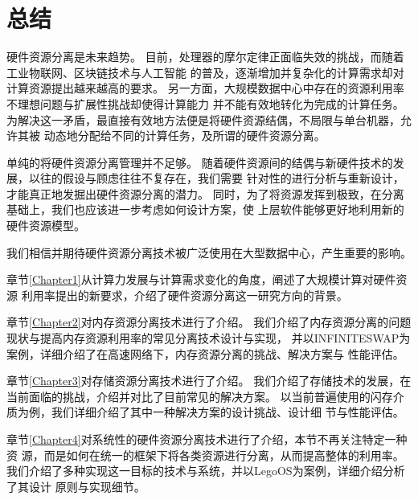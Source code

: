 \chapter{总结} %

\label{Chapter5} %

硬件资源分离是未来趋势。
目前，处理器的摩尔定律正面临失效的挑战，而随着工业物联网、区块链技术与人工智能
的普及，逐渐增加并复杂化的计算需求却对计算资源提出越来越高的要求。
另一方面，大规模数据中心中存在的资源利用率不理想问题与扩展性挑战却使得计算能力
并不能有效地转化为完成的计算任务。
为解决这一矛盾，最直接有效地方法便是将硬件资源结偶，不局限与单台机器，允许其被
动态地分配给不同的计算任务，及所谓的硬件资源分离。

单纯的将硬件资源分离管理并不足够。
随着硬件资源间的结偶与新硬件技术的发展，以往的假设与顾虑往往不复存在，我们需要
针对性的进行分析与重新设计，才能真正地发掘出硬件资源分离的潜力。
同时，为了将资源发挥到极致，在分离基础上，我们也应该进一步考虑如何设计方案，使
上层软件能够更好地利用新的硬件资源模型。

我们相信并期待硬件资源分离技术被广泛使用在大型数据中心，产生重要的影响。

章节\ref{Chapter1}从计算力发展与计算需求变化的角度，阐述了大规模计算对硬件资源
利用率提出的新要求，介绍了硬件资源分离这一研究方向的背景。

章节\ref{Chapter2}对内存资源分离技术进行了介绍。
我们介绍了内存资源分离的问题现状与提高内存资源利用率的常见分离技术设计与实现，
并以INFINITESWAP为案例，详细介绍了在高速网络下，内存资源分离的挑战、解决方案与
性能评估。

章节\ref{Chapter3}对存储资源分离技术进行了介绍。
我们介绍了存储技术的发展，在当前面临的挑战，介绍并对比了目前常见的解决方案。
以当前普遍使用的闪存介质为例，我们详细介绍了其中一种解决方案的设计挑战、设计细
节与性能评估。

章节\ref{Chapter4}对系统性的硬件资源分离技术进行了介绍，本节不再关注特定一种资
源，而是如何在统一的框架下将各类资源进行分离，从而提高整体的利用率。
我们介绍了多种实现这一目标的技术与系统，并以LegoOS为案例，详细介绍分析了其设计
原则与实现细节。